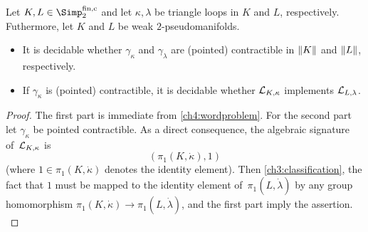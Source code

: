 \begin{thCorollary}
    \label{ch4:latonpmfd}
    Let $K,L\in\finSimp$ and let $\kappa,\lambda$ be triangle loops in $K$ and
    $L$, respectively. Futhermore, let $K$ and $L$ be weak $2$-pseudomanifolds.
    \begin{itemize}
        \item 
            It is decidable whether $\gamma_\kappa$ and $\gamma_\lambda$
            are (pointed) contractible in $\lVert K\rVert$ and $\lVert L\rVert$,
            respectively.
            
        \item
            If $\gamma_\kappa$ is (pointed) contractible,
            it is decidable whether $\mathcal{L}_{K,\kappa}$ implements $\mathcal{L}_{L,\lambda}$.
    \end{itemize}
\end{thCorollary}

\begin{proof}
    The first part is immediate from \cref{ch4:wordproblem}. For the second
    part let $\gamma_\kappa$ be pointed  contractible. As a direct consequence, the
    algebraic signature of~$\mathcal{L}_{K,\kappa}$ is
    \[ (\pi_1(K,\dot\kappa), 1) \]
    (where $1\in\pi_1(K,\dot\kappa)$ denotes the identity element).
    Then \cref{ch3:classification}, the fact that $1$ must be mapped to the
    identity element of~$\pi_1(L,\dot\lambda)$ by any group homomorphism
    $\pi_1(K,\dot\kappa)\to\pi_1(L,\dot\lambda)$, and the first part imply
    the assertion.
    \\
\end{proof}

